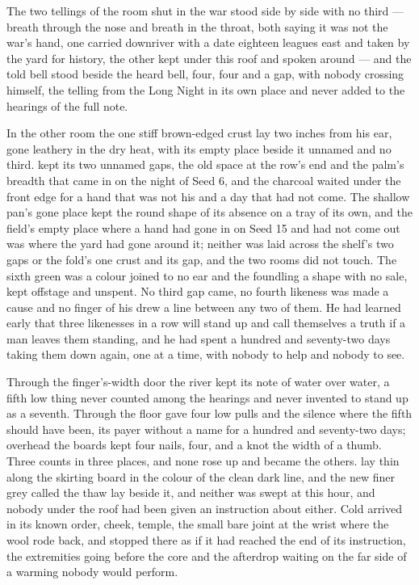 The two tellings of the room shut in the war stood side by side with no third --- breath through the nose and breath in the throat, both saying it was not the war's hand, one carried downriver with a date eighteen leagues east and taken by the yard for history, the other kept under this roof and spoken around --- and the told bell stood beside the heard bell, four, four and a gap, with nobody crossing himself, the telling from the Long Night in its own place and never added to the hearings of the full note.

In the other room the one stiff brown-edged crust lay two inches from his ear, gone leathery in the dry heat, with its empty place beside it unnamed and no third.  kept its two unnamed gaps, the old space at the row's end and the palm's breadth that came in on the night of Seed 6, and the charcoal waited under the front edge for a hand that was not his and a day that had not come. The shallow pan's gone place kept the round shape of its absence on a tray of its own, and the field's empty place where a hand had gone in on Seed 15 and had not come out was where the yard had gone around it; neither was laid across the shelf's two gaps or the fold's one crust and its gap, and the two rooms did not touch. The sixth green was a colour joined to no ear and the foundling a shape with no sale, kept offstage and unspent. No third gap came, no fourth likeness was made a cause and no finger of his drew a line between any two of them. He had learned early that three likenesses in a row will stand up and call themselves a truth if a man leaves them standing, and he had spent a hundred and seventy-two days taking them down again, one at a time, with nobody to help and nobody to see.

Through the finger's-width door the river kept its note of water over water, a fifth low thing never counted among the hearings and never invented to stand up as a seventh. Through the floor  gave four low pulls and the silence where the fifth should have been, its payer without a name for a hundred and seventy-two days; overhead the boards kept four nails, four, and a knot the width of a thumb. Three counts in three places, and none rose up and became the others.  lay thin along the skirting board in the colour of the clean dark line, and the new finer grey called the thaw lay beside it, and neither was swept at this hour, and nobody under the roof had been given an instruction about either. Cold arrived in its known order, cheek, temple, the small bare joint at the wrist where the wool rode back, and stopped there as if it had reached the end of its instruction, the extremities going before the core and the afterdrop waiting on the far side of a warming nobody would perform.

